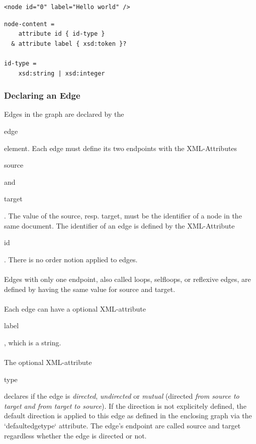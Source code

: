 \documentclass[a4paper,10pt]{article}
\begin{document}
\lstset{ style=gexf }
\begin{lstlisting}[caption={A node!},label=aNode]
<node id="0" label="Hello world" />
\end{lstlisting}

\lstset{ style=rnc }
\begin{lstlisting}[caption={Node Specification},label=nodeRNC]
node-content =
    attribute id { id-type }
  & attribute label { xsd:token }?

id-type =
    xsd:string | xsd:integer
\end{lstlisting}

\subsubsection{Declaring an Edge}

Edges in the graph are declared by the \begin{footnotesize}edge\end{footnotesize} element. Each edge must define its two endpoints with the XML-Attributes \begin{footnotesize}source\end{footnotesize} and \begin{footnotesize}target\end{footnotesize}. The value of the source, resp. target, must be the identifier of a node in the same document. The identifier of an edge is defined by the XML-Attribute \begin{footnotesize}id\end{footnotesize}. There is no order notion applied to edges.

\paragraph{}
Edges with only one endpoint, also called loops, selfloops, or reflexive edges, are defined by having the same value for source and target.

\paragraph{}
Each edge can have a optional XML-attribute \begin{footnotesize}label\end{footnotesize}, which is a string.

\paragraph{}
The optional XML-attribute \begin{footnotesize}type\end{footnotesize} declares if the edge is \textit{directed}, \textit{undirected} or \textit{mutual} (directed \textit{from source to target and from target to source}). If the direction is not explicitely defined, the default direction is applied to this edge as defined in the enclosing graph via the `defaultedgetype` attribute. The edge's endpoint are called source and target regardless whether the edge is directed or not.
\end{document}
